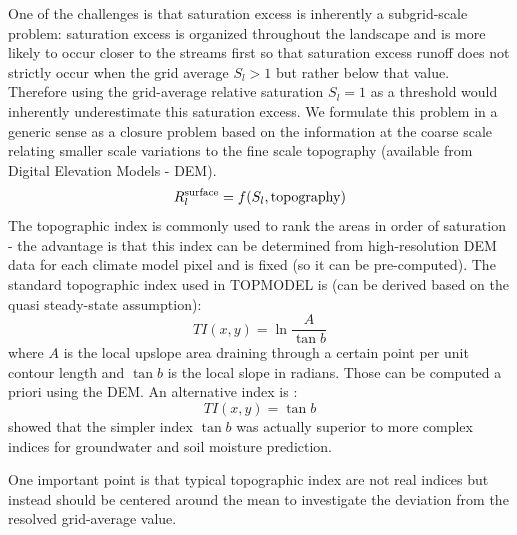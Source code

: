 \documentclass[twoside,10pt]{report}
\begin{document}
One of the challenges is that saturation excess is inherently a subgrid-scale problem: saturation excess is organized throughout the landscape and is more likely to occur closer to the streams first so that saturation excess runoff does not strictly occur when the grid average $S_l > 1$ but rather below that value. Therefore using the grid-average relative saturation $S_l=1$ as a threshold would inherently underestimate this saturation excess. We formulate this problem in a generic sense as a closure problem based on the information at the coarse scale relating smaller scale variations to the fine scale topography (available from Digital Elevation Models - DEM). 
 \begin{equation}
    R_l^{\rm surface} = f(S_l,{\rm topography})
\end{equation}
The topographic index is commonly used to rank the areas in order of saturation - the advantage is that this index can be determined from high-resolution DEM data for each climate model pixel and is fixed (so it can be pre-computed). 
The standard topographic index used in TOPMODEL is \citep{Sorensen06, Beven79} (can be derived based on the quasi steady-state assumption): 
 \begin{equation}
    TI(x,y)=\ln \frac{A}{\tan b}
\end{equation}
where $A$ is the local upslope area draining through a certain point per unit contour length and $\tan b$ is the local slope in radians. Those can be computed a priori using the DEM.
An alternative index is \citep{Sorensen06, Beven79}: 
\begin{equation}
    TI(x,y)=\tan b
\end{equation}
\citet{Sorensen06} showed that the simpler index $\tan b$ was actually superior to more complex indices for groundwater and soil moisture prediction. 

One important point is that typical topographic index are not real indices but instead should be centered around the mean to investigate the deviation from the resolved grid-average value. 
\end{document}
